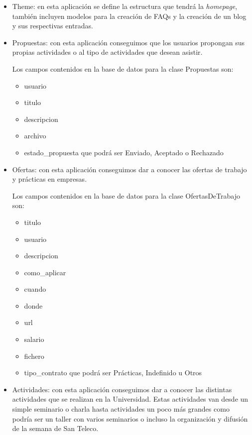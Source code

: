 \begin{itemize}
\item Theme: en esta aplicación se define la estructura que tendrá la \textit{homepage}, también incluyen modelos para la creación de FAQs y la creación de un blog y sus respectivas entradas.

\item Propuestas: con esta aplicación conseguimos que los usuarios propongan sus propias actividades o al tipo de actividades que desean asistir.

Los campos contenidos en la base de datos para la clase Propuestas son:
	\begin{itemize}
		\item usuario
		\item titulo
		\item descripcion
		\item archivo
		\item estado\_propuesta que podrá ser Enviado, Aceptado o Rechazado
	\end{itemize}
	
\item Ofertas: con esta aplicación conseguimos dar a conocer las ofertas de trabajo y prácticas en empresas.

Los campos contenidos en la base de datos para la clase OfertasDeTrabajo son:
	\begin{itemize}
		\item titulo
		\item usuario
		\item descripcion
		\item como\_aplicar
		\item cuando
		\item donde
		\item url
		\item salario
		\item fichero
		\item tipo\_contrato que podrá ser Prácticas, Indefinido u Otros
	\end{itemize}
	
\item Actividades: con esta aplicación conseguimos dar a conocer las distintas actividades que se realizan en la Universidad. Estas actividades van desde un simple seminario o charla hasta actividades un poco más grandes como podría ser un taller con varios seminarios o incluso la organización y difusión de la semana de San Teleco.


\end{itemize}
